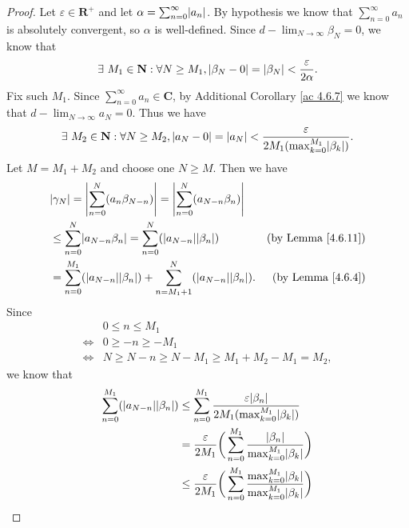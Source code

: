 \begin{proof}
    Let \(\varepsilon \in \mathbf{R}^+\) and let \(\alpha = \sum_{n = 0}^\infty \abs*{a_n}\).
    By hypothesis we know that \(\sum_{n = 0}^\infty a_n\) is absolutely convergent, so \(\alpha\) is well-defined.
    Since \(d - \lim_{N \to \infty} \beta_N = 0\), we know that
    \[
        \exists\ M_1 \in \mathbf{N} : \forall N \geq M_1, \abs*{\beta_N - 0} = \abs*{\beta_N} < \frac{\varepsilon}{2 \alpha}.
    \]
    Fix such \(M_1\).
    Since \(\sum_{n = 0}^\infty a_n \in \mathbf{C}\), by Additional Corollary \ref{ac 4.6.7} we know that \(d - \lim_{N \to \infty} a_N = 0\).
    Thus we have
    \[
        \exists\ M_2 \in \mathbf{N} : \forall N \geq M_2, \abs*{a_N - 0} = \abs*{a_N} < \frac{\varepsilon}{2 M_1 (\max_{k = 0}^{M_1} \abs*{\beta_k})}.
    \]
    Let \(M = M_1 + M_2\) and choose one \(N \geq M\).
    Then we have
    \begin{align*}
         & \abs*{\gamma_N} = \abs*{\sum_{n = 0}^N (a_n \beta_{N - n})} = \abs*{\sum_{n = 0}^N (a_{N - n} \beta_n)}                                           \\
         & \leq \sum_{n = 0}^N \abs*{a_{N - n} \beta_n} = \sum_{n = 0}^N (\abs*{a_{N - n}} \abs*{\beta_n})                  & \text{(by Lemma \ref{4.6.11})} \\
         & = \sum_{n = 0}^{M_1} (\abs*{a_{N - n}} \abs*{\beta_n}) + \sum_{n = M_1 + 1}^N (\abs*{a_{N - n}} \abs*{\beta_n}). & \text{(by Lemma \ref{4.6.4})}
    \end{align*}
    Since
    \begin{align*}
             & 0 \leq n \leq M_1                                     \\
        \iff & 0 \geq -n \geq -M_1                                   \\
        \iff & N \geq N - n \geq N - M_1 \geq M_1 + M_2 - M_1 = M_2,
    \end{align*}
    we know that
    \begin{align*}
        \sum_{n = 0}^{M_1} (\abs*{a_{N - n}} \abs*{\beta_n}) & \leq \sum_{n = 0}^{M_1} \frac{\varepsilon \abs*{\beta_n}}{2 M_1 (\max_{k = 0}^{M_1} \abs*{\beta_k})}                                      \\
                                                             & = \frac{\varepsilon}{2 M_1} \bigg(\sum_{n = 0}^{M_1} \frac{\abs*{\beta_n}}{\max_{k = 0}^{M_1} \abs*{\beta_k}}\bigg)                       \\
                                                             & \leq \frac{\varepsilon}{2 M_1} \bigg(\sum_{n = 0}^{M_1} \frac{\max_{k = 0}^{M_1} \abs*{\beta_k}}{\max_{k = 0}^{M_1} \abs*{\beta_k}}\bigg) \\

\end{align*}
\end{proof}
